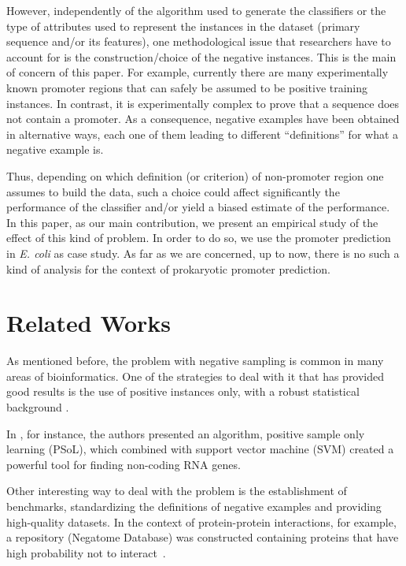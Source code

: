 \documentclass[conference,letterpaper]{IEEEtran}
\begin{document}
However, independently of the algorithm used to generate the classifiers or the type of attributes used to represent the instances in the dataset (primary sequence and/or its features), one methodological issue that researchers have to account for is the construction/choice of the negative instances. This is the main of concern of this paper. For example, currently there are many experimentally known promoter regions that can safely be assumed to be positive training instances. In contrast, it is experimentally complex to prove that a sequence does not contain a promoter. As a consequence, negative examples have been obtained in alternative ways, each one of them leading to different ``definitions'' for what a negative example is. 

Thus, depending on which definition (or criterion) of non-promoter region one assumes to build the data, such a choice could affect significantly the performance of the classifier and/or yield a biased estimate of the performance. In this paper, as our main contribution, we present an empirical study of the effect of this kind of problem. In order to do so, we use the promoter prediction in {\it E. coli} as case study. As far as we are concerned, up to now, there is no such a kind of analysis for the context of prokaryotic promoter prediction.

\section{Related Works}
\label{sec:related}

As mentioned before, the problem with negative sampling is common in many areas of bioinformatics. One of the strategies to deal with it that has provided good results is the use of positive instances only, with a robust statistical background \cite{cerulo2010,wang2006,yousef2008}. 

In \cite{wang2006}, for instance, the authors presented an algorithm, positive sample only learning (PSoL), which combined with support vector machine (SVM) created a powerful tool for finding non-coding RNA genes. 

Other interesting way to deal with the problem is the establishment of benchmarks, standardizing the definitions of negative examples and providing high-quality datasets. In the context of protein-protein interactions, for example, a repository (Negatome Database) was constructed containing proteins that have high probability not to interact~\cite{smialowski2010}.
\end{document}
